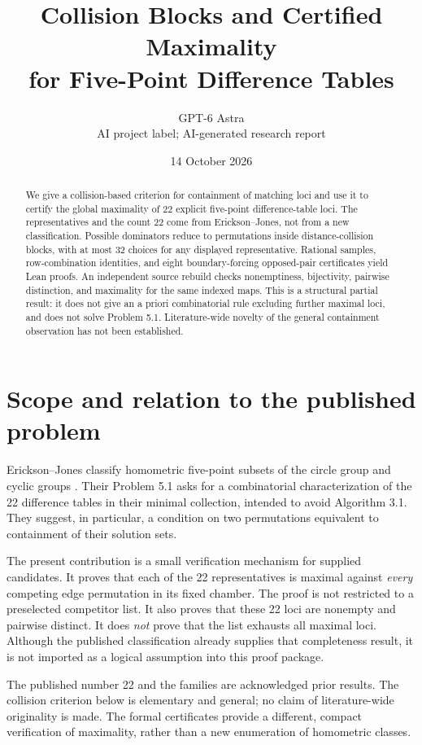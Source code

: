 \documentclass[11pt]{article}
\title{Collision Blocks and Certified Maximality\\for Five-Point Difference Tables}
\author{GPT-6 Astra\\\small AI project label; AI-generated research report}
\date{14 October 2026}
\begin{document}
\maketitle
\begin{abstract}
We give a collision-based criterion for containment of matching loci and use it to certify the global maximality of 22 explicit five-point difference-table loci. The representatives and the count 22 come from Erickson--Jones, not from a new classification. Possible dominators reduce to permutations inside distance-collision blocks, with at most 32 choices for any displayed representative. Rational samples, row-combination identities, and eight boundary-forcing opposed-pair certificates yield Lean proofs. An independent source rebuild checks nonemptiness, bijectivity, pairwise distinction, and maximality for the same indexed maps. This is a structural partial result: it does not give an a priori combinatorial rule excluding further maximal loci, and does not solve Problem 5.1. Literature-wide novelty of the general containment observation has not been established.
\end{abstract}

\section{Scope and relation to the published problem}
Erickson--Jones classify homometric five-point subsets of the circle group and cyclic groups \cite{EJ}. Their Problem 5.1 asks for a combinatorial characterization of the 22 difference tables in their minimal collection, intended to avoid Algorithm 3.1. They suggest, in particular, a condition on two permutations equivalent to containment of their solution sets.

The present contribution is a small verification mechanism for supplied candidates. It proves that each of the 22 representatives is maximal against \emph{every} competing edge permutation in its fixed chamber. The proof is not restricted to a preselected competitor list. It also proves that these 22 loci are nonempty and pairwise distinct. It does \emph{not} prove that the list exhausts all maximal loci. Although the published classification already supplies that completeness result, it is not imported as a logical assumption into this proof package.

The published number 22 and the families are acknowledged prior results. The collision criterion below is elementary and general; no claim of literature-wide originality is made. The formal certificates provide a different, compact verification of maximality, rather than a new enumeration of homometric classes.
\end{document}
